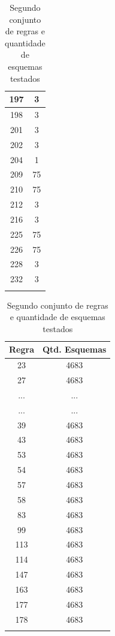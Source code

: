\documentclass[a4paper,12pt]{ltxdoc}
\begin{document}
\begin{center}
\begin{longtable}{ | c | c | }
  197 & 3  \\ \hline
  198 & 3  \\ \hline
  201 & 3  \\ \hline
  202 & 3  \\ \hline
  204 & 1  \\ \hline
  209 & 75 \\ \hline
  210 & 75 \\ \hline
  212 & 3  \\ \hline
  216 & 3  \\ \hline
  225 & 75 \\ \hline
  226 & 75 \\ \hline
  228 & 3  \\ \hline
  232 & 3  \\ \hline
\caption{Segundo conjunto de regras e quantidade de esquemas testados}\\
\end{longtable}
\end{center}


\begin{center}
  \begin{longtable}{ | c | c | } \hline
    Regra & Qtd. Esquemas     	\\\hline
    23 & 4683 \\\hline
    27 & 4683 \\\hline
    ... & ... \\ \hline
    ... & ... \\ \hline
    39 & 4683 \\\hline
    43 & 4683 \\\hline
    53 & 4683 \\\hline
    54 & 4683 \\\hline
    57 & 4683 \\\hline
    58 & 4683 \\\hline
    83 & 4683 \\\hline
    99 & 4683 \\\hline
    113 & 4683 \\\hline
    114 & 4683 \\\hline
    147 & 4683 \\\hline
    163 & 4683 \\\hline
    177 & 4683 \\\hline
    178 & 4683 \\\hline
  \caption{Segundo conjunto de regras e quantidade de esquemas testados}\\
  \end{longtable}
\end{center}
\end{document}
